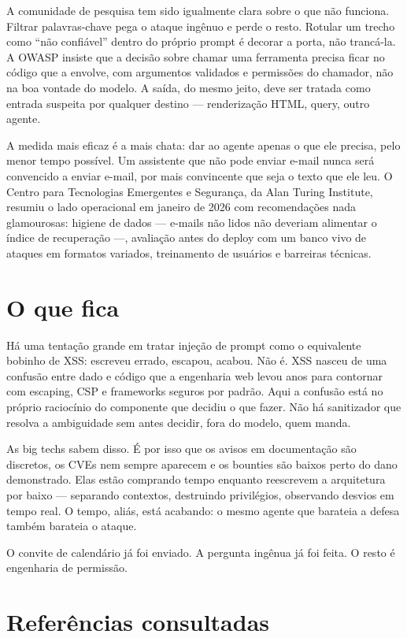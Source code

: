 \documentclass[12pt,a4paper]{article}
\begin{document}
A comunidade de pesquisa tem sido igualmente clara sobre o que não funciona. Filtrar palavras-chave pega o ataque ingênuo e perde o resto. Rotular um trecho como ``não confiável'' dentro do próprio prompt é decorar a porta, não trancá-la. A OWASP insiste que a decisão sobre chamar uma ferramenta precisa ficar no código que a envolve, com argumentos validados e permissões do chamador, não na boa vontade do modelo. A saída, do mesmo jeito, deve ser tratada como entrada suspeita por qualquer destino --- renderização HTML, query, outro agente.

A medida mais eficaz é a mais chata: dar ao agente apenas o que ele precisa, pelo menor tempo possível. Um assistente que não pode enviar e-mail nunca será convencido a enviar e-mail, por mais convincente que seja o texto que ele leu. O Centro para Tecnologias Emergentes e Segurança, da Alan Turing Institute, resumiu o lado operacional em janeiro de 2026 com recomendações nada glamourosas: higiene de dados --- e-mails não lidos não deveriam alimentar o índice de recuperação ---, avaliação antes do deploy com um banco vivo de ataques em formatos variados, treinamento de usuários e barreiras técnicas.

\section{O que fica}

Há uma tentação grande em tratar injeção de prompt como o equivalente bobinho de XSS: escreveu errado, escapou, acabou. Não é. XSS nasceu de uma confusão entre dado e código que a engenharia web levou anos para contornar com escaping, CSP e frameworks seguros por padrão. Aqui a confusão está no próprio raciocínio do componente que decidiu o que fazer. Não há sanitizador que resolva a ambiguidade sem antes decidir, fora do modelo, quem manda.

As big techs sabem disso. É por isso que os avisos em documentação são discretos, os CVEs nem sempre aparecem e os bounties são baixos perto do dano demonstrado. Elas estão comprando tempo enquanto reescrevem a arquitetura por baixo --- separando contextos, destruindo privilégios, observando desvios em tempo real. O tempo, aliás, está acabando: o mesmo agente que barateia a defesa também barateia o ataque.

O convite de calendário já foi enviado. A pergunta ingênua já foi feita. O resto é engenharia de permissão.

\section*{Referências consultadas}
\end{document}
